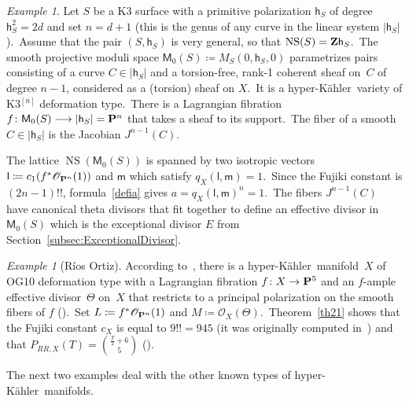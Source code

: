 \documentclass[12pt]{amsart}
\def\cO{\mathscr{O}}
\def\Z{{\bf Z}}
\def\P{{\bf P}}
\DeclareMathOperator{\NS}{NS}
\def\lra{\longrightarrow}
\def\hk{hyper-K\"ahler}
\theoremstyle{remark}
\newtheorem{exam}[lemm]{Example}
\def\hh{\ensuremath{\mathsf h}}
\def\lll{\ensuremath{\mathsf l}}
\def\mm{\ensuremath{\mathsf m}}
\def\M{\ensuremath{\mathsf M}}
\begin{document}
\begin{exam}\label{ex:K3n}
Let $S$ be a K3 surface with a primitive polarization $\hh_S$ of degree $\hh_S^2=2d$ and set $n=d+1$ (this is the genus of any curve in the linear system $ |\hh_S|$).\
Assume that the pair $(S,\hh_S)$ is very general, so that $\NS(S)=\Z \hh_S$.\
The smooth projective moduli space  $\M_0(S)\coloneqq M_{S}(0,\hh_S,0)$ parametrizes pairs consisting of a curve $C\in|\hh_S|$ and a torsion-free, rank-1 coherent sheaf on~$C$ of degree $n-1$, considered as a (torsion) sheaf on $X$.\
It is a \hk\ variety of K3$^{[n]}$ deformation type.\
There is a Lagrangian fibration
$
f\colon \M_0(S)\lra |\hh_S|=\P^{n}
$
that takes a sheaf to its support.\
The fiber of a smooth $C\in  |\hh_S|$ is the Jacobian $J^{n-1}(C)$.

The lattice $\NS(\M_0(S))$   is spanned by two isotropic vectors
$\lll\coloneqq c_1(f^*\cO_{\P^{n}}(1))$ and $  \mm$
 which satisfy $ q_X(\lll, \mm)=1$.\  Since the Fujiki constant is $ (2n-1)!!$, formula~\eqref{defia} gives $a = q_X(\lll, \mm)^n=1$.\  The fibers $J^{n-1}(C)$ have canonical theta divisors that fit together to define an effective divisor in $\M_0(S)$ which is the exceptional divisor $E$ from Section~\ref{subsec:ExceptionalDivisor}.
\end{exam}

\begin{exam}[R\'ios Ortiz]\label{ex:OG10}
According to~\cite{lsv}, there is a \hk\ manifold~$X$ of OG10 deformation type with a Lagrangian fibration \mbox{$f\colon X\to \P^5$} and an $f$-ample effective divisor~$\Theta$ on~$X$ that restricts to a principal polarization on the smooth fibers of $f$ (\cite[Proposition~5.3]{lsv}).\
Set $L\coloneqq f^*\cO_{\P^n}(1)$ and $M\coloneqq\cO_X(\Theta)$.\
Theorem~\ref{th21} shows that the Fujiki constant $c_X$ is equal to $9!!=945$ (it was originally computed in~\cite{rap}) and that
$
P_{RR,X}(T)= \binom{ \frac{T }{2  }+6}{5}$ (\cite{ort}).
\end{exam}

The next two examples deal with the other   known types of  \hk\ manifolds.
\end{document}
